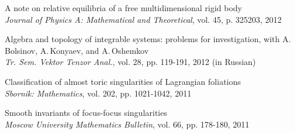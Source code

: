 \documentclass[a4paper, 12pt]{article}
\begin{document}
\begin{compactenum}
\item {{A note on relative equilibria of a free
multidimensional rigid body}}\\\textit{Journal of Physics A: Mathematical and Theoretical}, {vol. 45}, p. 325203, 2012
\item {Algebra and topology of integrable systems: problems for investigation}, with A.\,Bolsinov, A.\,Konyaev, and A.\,Oshemkov\\\textit{Tr. Sem. Vektor Tenzor Anal.}, {vol. 28}, pp. 119-191, 2012 (in Russian)
\item {{Classification of almost toric singularities of Lagrangian foliations}}\\\textit{Sbornik: Mathematics}, {vol. 202}, pp. 1021-1042, 2011
\item {{Smooth invariants of focus-focus singularities}} \\
\textit{Moscow University Mathematics Bulletin}, {vol. 66}, pp. 178-180, 2011
\end{compactenum}

\end{document}
